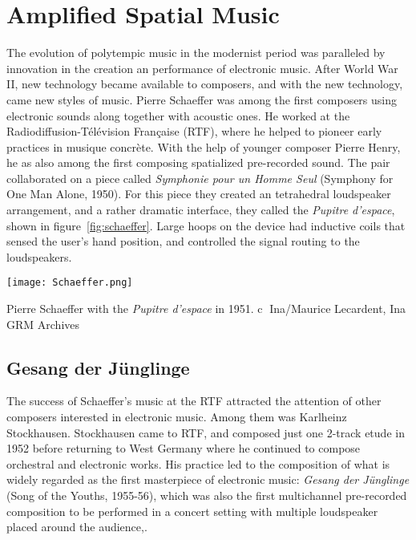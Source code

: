 \section{Amplified Spatial Music}
\label{sec:spatial-developments}
The evolution of polytempic music in the modernist period was
paralleled by innovation in the creation an performance of electronic
music. After World War II, new technology became available to
composers, and with the new technology, came new styles of music.
Pierre Schaeffer was among the first composers using electronic sounds
along together with acoustic ones.  He worked at the
Radiodiffusion-T\'{e}l\'{e}vision Fran\c{c}aise (RTF), where he helped
to pioneer early practices in musique concr\`{e}te. With the help of
younger composer Pierre Henry, he as also among the first composing
spatialized pre-recorded sound. The pair collaborated on a piece
called \textit{Symphonie pour un Homme Seul} (Symphony for One Man
Alone, 1950). For this piece they created an tetrahedral loudspeaker
arrangement, and a rather dramatic interface, they called the
\textit{Pupitre d'espace}, shown in figure~\ref{fig:schaeffer}. Large
hoops on the device had inductive coils that sensed the user's hand
position, and controlled the signal routing to the
loudspeakers.\cite{Holm2008}
\begin{marginfigure}
\texttt{[image: Schaeffer.png]}
\caption{Pierre Schaeffer with the \textit{Pupitre d'espace} in
  1951. \textcircled{c} Ina/Maurice Lecardent, Ina GRM Archives}
\label{fig:schaeffer}
\end{marginfigure}


\subsection{Gesang der J\"{u}nglinge}
The success of Schaeffer's music at the RTF attracted the attention of
other composers interested in electronic music. Among them was
Karlheinz Stockhausen. Stockhausen came to RTF, and composed just one
2-track etude in 1952 before returning to West Germany where he
continued to compose orchestral and electronic works. His practice led
to the composition of what is widely regarded as the first masterpiece
of electronic music: \textit{Gesang der J\"{u}nglinge} (Song of the
Youths, 1955-56), which was also the first multichannel pre-recorded
composition to be performed in a concert setting with multiple
loudspeaker placed around the audience,\cite{Grout2006}. 


